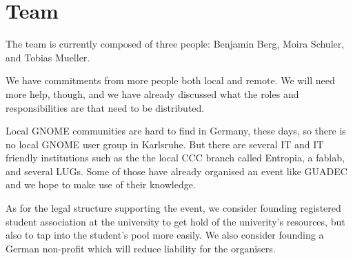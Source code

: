 
\section{Team}

The team is currently composed of three people:
Benjamin Berg, Moira Schuler, and Tobias Mueller.

We have commitments from more people both local and remote.
We will need more help, though, and we have already discussed
what the roles and responsibilities are that need to be distributed.

Local GNOME communities are hard to find in Germany, these days,
so there is no local GNOME user group in Karlsruhe.
But there are several IT and IT friendly institutions such as the
the local CCC branch called Entropia, a fablab, and several LUGs.
Some of those have already organised an event like GUADEC and
we hope to make use of their knowledge.

As for the legal structure supporting the event,
we consider founding registered student association at
the university to get hold of the univerity's resources,
but also to tap into the student's pool more easily.
We also consider founding a German non-profit which will reduce
liability for the organisers.
